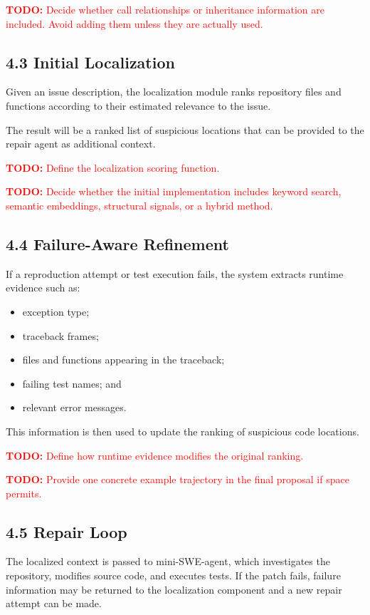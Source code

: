 \documentclass[11pt]{article}
\newcommand{\todo}[1]{%
    \textcolor{red}{\textbf{TODO:} #1}%
}
\begin{document}
\todo{Decide whether call relationships or inheritance information are
included. Avoid adding them unless they are actually used.}


\subsection*{4.3 Initial Localization}

Given an issue description, the localization module ranks repository
files and functions according to their estimated relevance to the issue.

The result will be a ranked list of suspicious locations that can be
provided to the repair agent as additional context.

\todo{Define the localization scoring function.}

\todo{Decide whether the initial implementation includes keyword search,
semantic embeddings, structural signals, or a hybrid method.}


\subsection*{4.4 Failure-Aware Refinement}

If a reproduction attempt or test execution fails, the system extracts
runtime evidence such as:

\begin{itemize}[leftmargin=*, itemsep=0.25em]
    \item exception type;
    \item traceback frames;
    \item files and functions appearing in the traceback;
    \item failing test names; and
    \item relevant error messages.
\end{itemize}

This information is then used to update the ranking of suspicious code
locations.

\todo{Define how runtime evidence modifies the original ranking.}

\todo{Provide one concrete example trajectory in the final proposal if
space permits.}


\subsection*{4.5 Repair Loop}

The localized context is passed to mini-SWE-agent, which investigates the
repository, modifies source code, and executes tests. If the patch fails,
failure information may be returned to the localization component and a
new repair attempt can be made.
\end{document}
